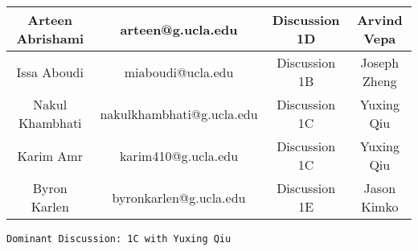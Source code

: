 \documentclass[10pt, letterpaper]{article}
\begin{document}
\begin{table}
	\begin{tabular}{| c c c c |}
		
		\hline
		Arteen Abrishami & arteen@g.ucla.edu & Discussion 1D & Arvind Vepa \\
		\hline
		Issa Aboudi & miaboudi@ucla.edu & Discussion 1B & Joseph Zheng \\
		\hline
		Nakul Khambhati & nakulkhambhati@g.ucla.edu & Discussion 1C & Yuxing Qiu \\
		\hline
		Karim Amr & karim410@g.ucla.edu & Discussion 1C & Yuxing Qiu \\
		\hline
		Byron Karlen & byronkarlen@g.ucla.edu & Discussion 1E & Jason Kimko\\
		\hline
		
	\end{tabular}
\end{table}

\texttt{Dominant Discussion: 1C with Yuxing Qiu}
\end{document}
